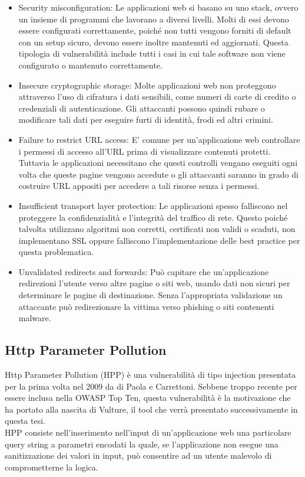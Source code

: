 \begin{itemize}
\item Security misconfiguration: Le applicazioni web si basano su uno stack, ovvero un insieme di programmi che lavorano a diversi livelli. Molti di essi devono essere configurati correttamente, poiché non tutti vengono forniti di default con un setup sicuro, devono essere inoltre mantenuti ed aggiornati. Questa tipologia di vulnerabilità include tutti i casi in cui tale software non viene configurato o mantenuto correttamente.
\item Insecure cryptographic storage: Molte applicazioni web non proteggono attraverso l'uso di cifratura i dati sensibili, come numeri di carte di credito o credenziali di autenticazione. Gli attaccanti possono quindi rubare o modificare tali dati per eseguire furti di identità, frodi ed altri crimini.
\item Failure to restrict URL access: E' comune per un'applicazione web controllare i permessi di accesso all'URL prima di visualizzare contenuti protetti. Tuttavia le applicazioni necessitano che questi controlli vengano eseguiti ogni volta che queste pagine vengono accedute o gli attaccanti saranno in grado di costruire URL appositi per accedere a tali risorse senza i permessi.
\item Insufficient transport layer protection: Le applicazioni spesso falliscono nel proteggere la confidenzialità e l'integrità del traffico di rete. Questo poiché talvolta utilizzano algoritmi non corretti, certificati non validi o scaduti, non implementano SSL oppure falliscono l'implementazione delle best practice per questa problematica.
\item Unvalidated redirects and forwards: Può capitare che un'applicazione redirezioni l'utente verso altre pagine o siti web, usando dati non sicuri per determinare le pagine di destinazione. Senza l'appropriata validazione un attaccante può redirezionare la vittima verso phishing o siti contenenti malware.
\end{itemize}

\subsection{Http Parameter Pollution}
Http Parameter Pollution (HPP) è una vulnerabilità di tipo injection presentata per la prima volta nel 2009 da di Paola e Carrettoni\cite{27 su hpp}. Sebbene troppo recente per essere inclusa nella OWASP Top Ten, questa vulnerabilità è la motivazione che ha portato alla nascita di Vulture, il tool che verrà presentato successivamente in questa tesi.\\
HPP consiste nell'inserimento nell'input di un'applicazione web una particolare query string a parametri encodati la quale, se l'applicazione non esegue una sanitizzazione dei valori in input, può consentire ad un utente malevolo di comprometterne la logica.

